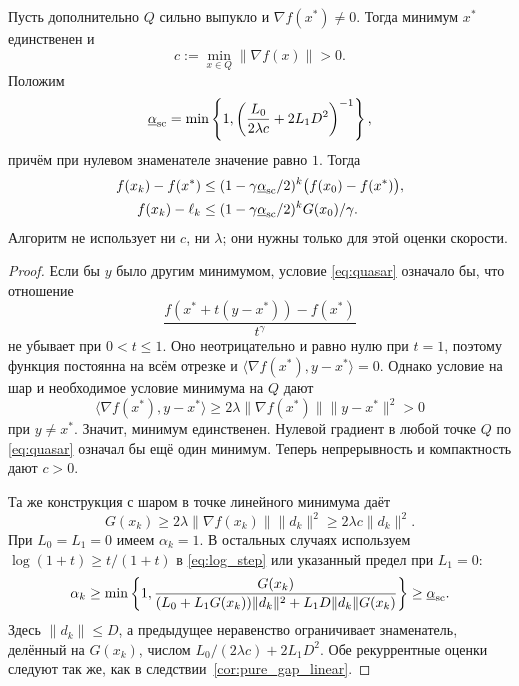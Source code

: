 \begin{theorem}
\label{thm:strong_set_linear}
Пусть дополнительно $Q$ сильно выпукло и $\nabla f(x^*)\ne0$.
Тогда минимум $x^*$ единственен и
\[
 c:=\min_{x\in Q}\|\nabla f(x)\|>0.
\]
Положим
\[
 \underline\alpha_{\rm sc}=
 \min\left\{1,\left(\frac{L_0}{2\lambda c}+2L_1D^2\right)^{-1}\right\},
\]
причём при нулевом знаменателе значение равно $1$. Тогда
\begin{align*}
 f(x_k)-f(x^*)&\le
 (1-\gamma\underline\alpha_{\rm sc}/2)^k
       \bigl(f(x_0)-f(x^*)\bigr),\\
 f(x_k)-\ell_k&\le
 (1-\gamma\underline\alpha_{\rm sc}/2)^k G(x_0)/\gamma.
\end{align*}
Алгоритм не использует ни $c$, ни $\lambda$; они нужны только
для этой оценки скорости.
\end{theorem}
\begin{proof}
Если бы $y$ было другим минимумом, условие \eqref{eq:quasar}
означало бы, что отношение
\[
 \frac{f(x^*+t(y-x^*))-f(x^*)}{t^\gamma}
\]
не убывает при $0<t\le1$. Оно неотрицательно и равно нулю при
$t=1$, поэтому функция постоянна на всём отрезке и
$\langle\nabla f(x^*),y-x^*\rangle=0$.
Однако условие на шар и необходимое условие минимума на $Q$ дают
\[
 \langle\nabla f(x^*),y-x^*\rangle
 \ge2\lambda\|\nabla f(x^*)\|\|y-x^*\|^2>0
\]
при $y\ne x^*$. Значит, минимум единственен.
Нулевой градиент в любой точке $Q$ по \eqref{eq:quasar} означал бы
ещё один минимум. Теперь непрерывность и компактность дают $c>0$.

Та же конструкция с шаром в точке линейного минимума даёт
\[
 G(x_k)\ge2\lambda\|\nabla f(x_k)\|\|d_k\|^2
           \ge2\lambda c\|d_k\|^2.
\]
При $L_0=L_1=0$ имеем $\alpha_k=1$. В остальных случаях используем
$\log(1+t)\ge t/(1+t)$ в \eqref{eq:log_step}
или указанный предел при $L_1=0$:
\[
 \alpha_k\ge\min\left\{1,
 \frac{G(x_k)}{(L_0+L_1G(x_k))\|d_k\|^2
                      +L_1D\|d_k\|G(x_k)}\right\}
 \ge\underline\alpha_{\rm sc}.
\]
Здесь $\|d_k\|\le D$, а предыдущее неравенство ограничивает
знаменатель, делённый на $G(x_k)$, числом
$L_0/(2\lambda c)+2L_1D^2$.
Обе рекуррентные оценки следуют так же, как в
следствии~\ref{cor:pure_gap_linear}.
\end{proof}
